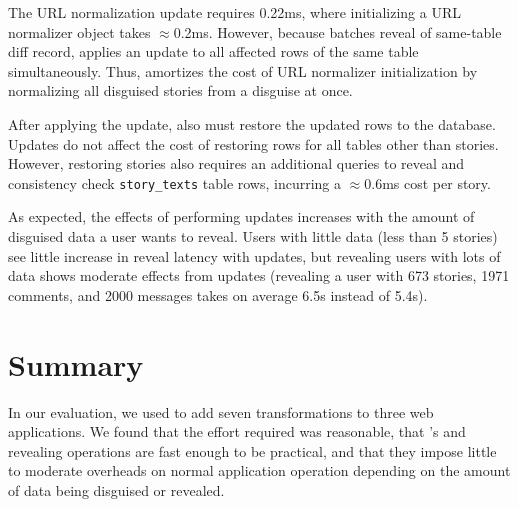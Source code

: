 %
The URL normalization update requires 0.22ms, where initializing a URL
normalizer object takes $\approx$0.2ms.
%
However, because \sys batches reveal of same-table diff record, \sys applies an
update to all affected rows of the same table simultaneously. Thus, \sys
amortizes the cost of URL normalizer initialization by normalizing
all disguised stories from a disguise at once.
%

%
After applying the update, \sys also must restore the updated rows to the
database. Updates do not affect the cost of restoring rows for all tables other
than stories.  However, restoring stories also requires an additional queries to
reveal and consistency check \texttt{story\_texts} table rows, incurring a
$\approx$0.6ms cost per story.
%

%
As expected, the effects of performing updates increases with the amount of
disguised data a user wants to reveal.
%
Users with little data (\eg less than 5 stories) see little increase in reveal
latency with updates, but revealing users with lots of data shows moderate
effects from updates (\eg revealing a user with 673 stories, 1971 comments, and
2000 messages takes on average 6.5s instead of 5.4s).
%

%
\section{Summary}
In our evaluation, we used \sys to add seven \xxing transformations to three web
applications. We found that the effort required was reasonable, that \sys's
\xxing and revealing operations are fast enough to be practical, and that they
impose little to moderate overheads on normal application operation depending on
the amount of data being disguised or revealed.
%
